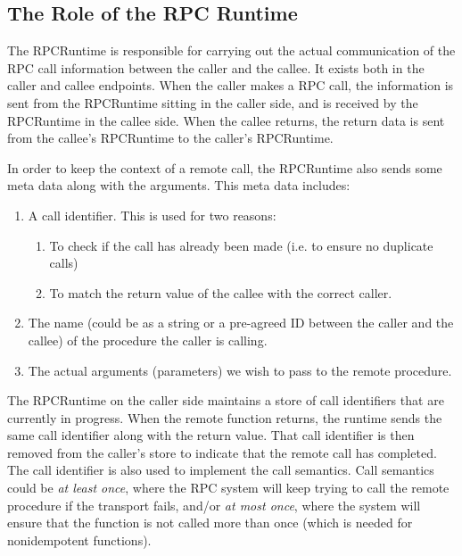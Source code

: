 \subsection{The Role of the RPC Runtime} %
\label{sub:rpcruntime_background}

The RPCRuntime is responsible for carrying out the actual communication of the RPC call information between the caller and the callee. It exists both in the caller and callee endpoints. When the caller makes a RPC call, the information is sent from the RPCRuntime sitting in the caller side, and is received by the RPCRuntime in the callee side. When the callee returns, the return data is sent from the callee's RPCRuntime to the caller's RPCRuntime.

In order to keep the context of a remote call, the RPCRuntime also sends some meta data along with the arguments. This meta data includes:

\begin{enumerate}
	\item A call identifier. This is used for two reasons:
	\begin{enumerate}
		\item To check if the call has already been made (i.e. to ensure no duplicate calls)
		\item To match the return value of the callee with the correct caller.
	\end{enumerate}
	\item The name (could be as a string or a pre-agreed ID between the caller and the callee) of the procedure the caller is calling.
	\item The actual arguments (parameters) we wish to pass to the remote procedure.
\end{enumerate}

The RPCRuntime on the caller side maintains a store of call identifiers that are currently in progress. When the remote function returns, the runtime sends the same call identifier along with the return value. That call identifier is then removed from the caller's store to indicate that the remote call has completed. The call identifier is also used to implement the call semantics. Call semantics could be \emph{at least once}, where the RPC system will keep trying to call the remote procedure if the transport fails, and/or \emph{at most once}, where the system will ensure that the function is not called more than once (which is needed for nonidempotent functions).



